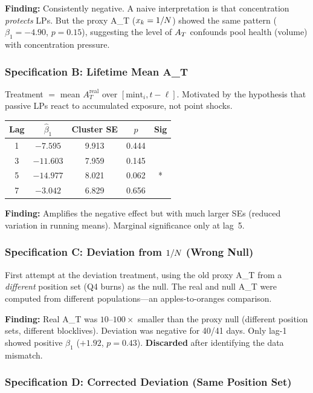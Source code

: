 \textbf{Finding:} Consistently negative. A naive interpretation is that
concentration \emph{protects} LPs. But the proxy A\_T ($x_k = 1/N$)
showed the same pattern ($\beta_1 = -4.90$, $p = 0.15$), suggesting the level
of $A_T$ confounds pool health (volume) with concentration pressure.

\subsubsection{Specification B: Lifetime Mean A\_T}

Treatment $=$ mean $A_T^{\text{real}}$ over $[\text{mint}_i, t - \ell]$.
Motivated by the hypothesis that passive LPs react to accumulated exposure,
not point shocks.

\begin{center}
\begin{tabular}{@{}ccccc@{}}
\toprule
Lag & $\hat{\beta}_1$ & Cluster SE & $p$ & Sig \\
\midrule
1 & $-7.595$ & 9.913 & 0.444 & \\
3 & $-11.603$ & 7.959 & 0.145 & \\
5 & $-14.977$ & 8.021 & 0.062 & * \\
7 & $-3.042$ & 6.829 & 0.656 & \\
\bottomrule
\end{tabular}
\end{center}

\textbf{Finding:} Amplifies the negative effect but with much larger SEs
(reduced variation in running means). Marginal significance only at lag~5.

\subsubsection{Specification C: Deviation from $1/N$ (Wrong Null)}

First attempt at the deviation treatment, using the old proxy A\_T from a
\emph{different} position set (Q4 burns) as the null. The real and null A\_T
were computed from different populations---an apples-to-oranges comparison.

\textbf{Finding:} Real A\_T was $10$--$100\times$ smaller than the proxy null
(different position sets, different blocklives). Deviation was negative for
40/41 days. Only lag-1 showed positive $\beta_1$ ($+1.92$, $p = 0.43$).
\textbf{Discarded} after identifying the data mismatch.

\subsubsection{Specification D: Corrected Deviation (Same Position Set)}

